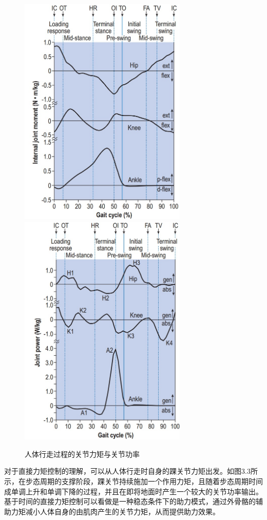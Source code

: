 \begin{figure}[htb]
    \includegraphics[width=8cm]{fig/f52.jpg}
    \includegraphics[width=8cm]{fig/f53.jpg}
    \caption{人体行走过程的关节力矩与关节功率\cite{p44}}
    \label{fig:subfigss}
\end{figure}

对于直接力矩控制的理解，可以从人体行走时自身的踝关节力矩出发。如图3.3所示，在步态周期的支撑阶段，踝关节持续施加一个作用力矩，且随着步态周期时间成单调上升和单调下降的过程，并且在即将地面时产生一个较大的关节功率输出。基于时间的直接力矩控制可以看做是一种稳态条件下的助力模式，通过外骨骼的辅助力矩减小人体自身的由肌肉产生的关节力矩，从而提供助力效果。

